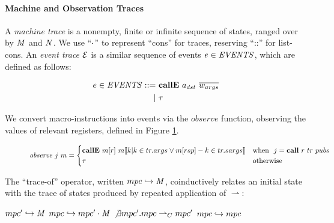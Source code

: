 \documentclass[10pt,conference]{ieeetran}%
\theoremstyle{definition}
\begin{document}
\paragraph*{Machine and Observation Traces}
\label{sec:traces}

A {\em machine trace} is a nonempty, finite or infinite sequence
of states, ranged over by \(\mathit{M}\) and \(\mathit{N}\).
We use ``\(\cdot\)'' to represent ``cons'' for traces, reserving ``::''
for list-cons. An {\em event trace} \(\mathcal{E}\) is a similar sequence of
events \(e \in \mathit{EVENTS}\), which are defined as follows:

\[\begin{split}
e \in \mathit{EVENTS} ::= & ~ \mathbf{callE} ~ a_{dst} ~ \overline{w_{args}} \\
| & ~ \tau \\
\end{split}\]


We convert macro-instructions into events via the \(\mathit{observe}\)
function, observing the values of relevant registers, defined in Figure \ref{fig:observe}.

\begin{figure*}
\[\mathit{observe} ~ j ~ m =
\begin{cases}
  \mathbf{callE} ~ m[r] ~ m \llbracket k | k \in tr.args \lor m[rsp] - k \in tr.sargs \rrbracket
  & \textnormal{when } ~ j = \mathbf{call} ~ r ~ tr ~ pubs \\
  \tau & \textnormal{otherwise} \\
\end{cases}\]
\label{fig:observe}
\end{figure*}

The ``trace-of'' operator, written \(mpc \hookrightarrow \mathit{M} \),
coinductively relates an initial state with the trace of states
produced by repeated application of \(\rightharpoonup\):

            {\(mpc' \hookrightarrow \mathit{M} \)}
            {\(mpc \hookrightarrow mpc' \cdot \mathit{M} \)}%
\judgment%
         {\(\not\exists mpc'. mpc \overset{}{\rightharpoonup}_C mpc'\)}
         {\(mpc \hookrightarrow mpc\)}
\end{document}
